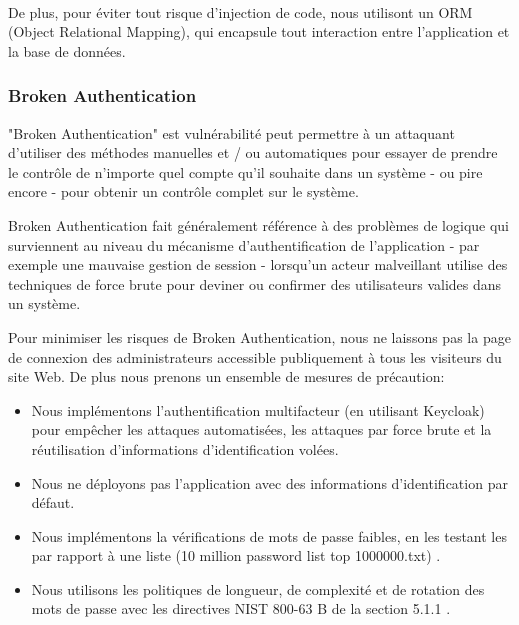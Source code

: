         \paragraph{}
        De plus, pour éviter tout risque d'injection de code, nous utilisont un ORM (Object 
        Relational Mapping), qui encapsule tout interaction entre l'application et la
        base de données.

    \subsubsection{Broken Authentication}
        "Broken Authentication" est vulnérabilité peut permettre à un attaquant d'utiliser 
        des méthodes manuelles et / ou automatiques pour essayer de prendre le contrôle de 
        n'importe quel compte qu'il souhaite dans un système - ou pire encore - pour obtenir 
        un contrôle complet sur le système.
        \par 
        Broken Authentication fait généralement référence à des problèmes de logique 
        qui surviennent au niveau du mécanisme d’authentification de l’application - par exemple une 
        mauvaise gestion de session - lorsqu'un 
        acteur malveillant utilise des techniques de force brute pour deviner ou confirmer des 
        utilisateurs valides dans un système.
        \par 
        Pour minimiser les risques de Broken Authentication, nous ne laissons pas la page de connexion 
        des administrateurs accessible publiquement à tous les visiteurs du site Web. De plus nous prenons 
        un ensemble de mesures de précaution:
        \begin{itemize}
            \item Nous implémentons l'authentification multifacteur (en utilisant Keycloak) pour empêcher 
            les attaques automatisées, les attaques par force brute et 
            la réutilisation d'informations d'identification volées.
            \item Nous ne déployons pas l'application avec des informations d'identification par défaut.
            \item Nous implémentons la vérifications de mots de passe faibles, en les testant les 
             par rapport à une liste (10 million password list top 1000000.txt) \cite{weakpass}.
            \item Nous utilisons les politiques de longueur, de complexité et de rotation des mots de passe 
            avec les directives NIST 800-63 B de la section 5.1.1 \cite{grassi2016draft} \cite{nist}.
        \end{itemize}